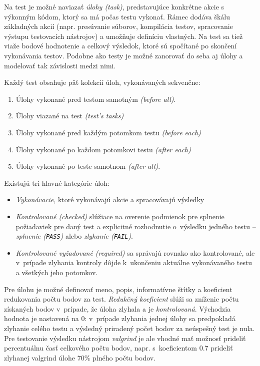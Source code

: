\documentclass[
  digital, %
  oneside, %
  table,   %
  lof,     %
  lot,   %
]{fithesis3}
\begin{document}
Na test je možné naviazať \emph{úlohy (task)}, predstavujúce konkrétne akcie s výkonným kódom, ktorý sa má počas testu vykonať. Rámec dodáva škálu základných akcií (napr. presúvanie súborov, kompilácia testov, spracovanie výstupu testovacích nástrojov) a umožňuje definíciu vlastných. Na test sa tiež viaže bodové hodnotenie a celkový výsledok, ktoré sú spočítané po skončení vykonávania testov. Podobne ako testy je možné zanorovať do seba aj úlohy a modelovať tak závislosti medzi nimi.

Každý test obsahuje päť kolekcií úloh, vykonávaných sekvenčne:
\begin{enumerate}
    \item Úlohy vykonané pred testom samotným \emph{(before all)}.
    \item Úlohy viazané na test \emph{(test's tasks)}
    \item Úlohy vykonané pred každým potomkom testu \emph{(before each)} 
    \item Úlohy vykonané po každom potomkovi testu \emph{(after each)}
    \item Úlohy vykonané po teste samotnom \emph{(after all)}.
\end{enumerate}

Existujú tri hlavné kategórie úloh:
\begin{itemize}
    \item \emph{Vykonávacie}, ktoré vykonávajú akcie a spracovávajú výsledky
    \item \emph{Kontrolované (checked)} slúžiace na overenie podmienok pre splnenie požiadaviek pre daný test a explicitné rozhodnutie o~výsledku jedného testu -- \emph{splnenie (\texttt{PASS})} alebo \emph{zlyhanie (\texttt{FAIL})}.
    \item \emph{Kontrolované vyžadované (required)} sa správajú rovnako ako kontrolované, ale v~prípade zlyhania kontroly dôjde k~ukončeniu aktuálne vykonávaného testu a všetkých jeho potomkov.
\end{itemize}

Pre úlohu je možné definovať meno, popis, informatívne štítky a koeficient redukovania počtu bodov za test. \emph{Redukčný koeficient} slúži sa zníženie počtu získaných bodov v~prípade, že úloha zlyhala a je \emph{kontrolovaná}. Východzia hodnota je nastavená na $0$: v~prípade zlyhania jednej úlohy sa predpokladá zlyhanie celého testu a výsledný priradený počet bodov za neúspešný test je nula. Pre testovanie výsledku nástrojom \emph{valgrind} je ale vhodné mať možnosť prideliť percentuálnu časť celkového počtu bodov, napr. s~koeficientom $0.7$ prideliť zlyhanej valgrind úlohe $70\%$ plného počtu bodov.
\end{document}
